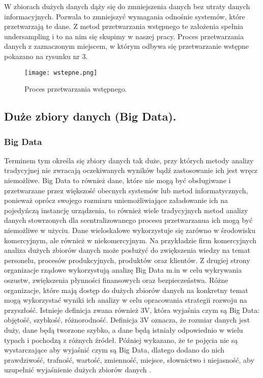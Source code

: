 \documentclass{article}
\begin{document}
W zbiorach dużych danych dąży się do zmniejszenia danych bez utraty danych informacyjnych. Pozwala to zmniejszyć wymagania odnośnie systemów, które przetwarzają te dane. Z metod przetwarzania wstępnego te założenia spełnia undersampling i to na nim się skupimy w naszej pracy. Proces przetwarzania danych z zaznaczonym miejscem, w którym odbywa się przetwarzanie wstępne pokazano na rysunku nr 3.\newline
\break
\begin{figure}[h!]
\texttt{[image: wstepne.png]}
\caption{Proces przetwarzania wstępnego.} 
\label{fig:under_oversampling}
\end{figure}
\break
\break
\break


\subsection{Duże zbiory danych (Big Data).}
\subsubsection{Big Data}
\hfill \break

Terminem tym określa się zbiory danych tak duże, przy których metody analizy tradycyjnej nie zwracają oczekiwanych wyników bądź zastosowanie ich jest wręcz niemożliwe. Big Data to również dane, które nie mogą być obsługiwane i przetwarzane przez większość obecnych systemów lub metod informatycznych, ponieważ oprócz swojego rozmiaru uniemożliwiające załadowanie ich na pojedyńczą instancję urządzenia, to również wiele tradycyjnych metod analizy danych stowrzonych dla scentralizowanego procesu przetwarzanua ich mogą być niemożliwe w użyciu. Dane wieloskalowe wykorzystuje się zarówno w środowisku komercyjnym, ale również w niekomercyjnym. Na przykładzie firm komercyjnych analiza dużych zbiorów danych może posłużyć do zwiększenia wiedzy na temat personelu, procesów produkcyjnych, produktów oraz klientów\cite{doi:10.1177/2053951716631130}\cite{8424689}\cite{Tsai2015BigDA}. Z drugiej strony organizacje rządowe wykorzystują analizę Big Data m.in w celu wykrywania oszustw, zwiększenia płynności finansowych oraz bezpieczeństwa. Różne organizacje, które mają dostęp do dużych zbiorów danych na konkretny temat mogą wykorzystać wyniki ich analizy w celu opracowania strategii rozwoju na przyszłość. Istnieje definicja zwana również 3V, która wyjaśnia czym są Big Data: objętość, szybkość, różnorodność. Definicja 3V oznacza, że rozmiar danych jest duży, dane będą tworzone szybko, a dane będą istniały odpowiednio w wielu typach i pochodzą z różnych źródeł. Później wykazano, że te pojęcia nie są wystarczające aby wyjaśnić czym są Big Data, dlatego dodano do nich prawdziwość, trafność, wartość, zmienność, miejsce, słownictwo i niejasność, aby uzupełnić wyjaśnienie dużych zbiorów danych \cite{ohlhorst2012big}. %
\end{document}
